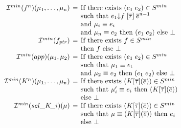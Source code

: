 \[\setlength{\arraycolsep}{2pt}
\begin{array}{rcl}
   \mlinterp{f^{\ar}}(\mu_1,\ldots,\mu_n) & = & 
       \multicolumn{1}{l}{\text{If there exists } (e_1\;e_2) \in S^{min}} \\
   & & \multicolumn{1}{l}{\text{such that } e_1{\SDownarrow}f\;[\taus]\;\oln{e}{\ar-1}} \\
   & & \multicolumn{1}{l}{\text{and } \mu_i \equiv e_i} \\
   & & \multicolumn{1}{l}{\text{and } \mu_{\ar} \equiv e_2 \text{ then } (e_1\;e_2) \text{ else } \bot} \\
   \mlinterp{f_{ptr}} & = & \text{If there exists } f \in S^{min} \\
                        &   & \text{then } f \text{ else } \bot \\
  \mlinterp{app}(\mu_1,\mu_2) & = & \text{If there exists } (e_1\;e_2) \in S^{min} \\ 
                         &   & \text{such that } \mu_1 \equiv e_1 \\ 
                         &   & \text{and } \mu_2 \equiv e_2 \text{ then } (e_1\;e_2) \text{ else } \bot \\
  \mlinterp{K^\ar}(\mu_1,\ldots,\mu_\ar) & = & \text{If there exists } (K[\taus](\ol{e})) \in S^{min} \\
                                    &  & \text{such that } \mu_i' \equiv e_i \text{ then } (K[\taus](\ol{e})) \\
                                    &  & \text{else } \bot \\
  \mlinterp{\sel{K}{i}}(\mu) & = & \text{If there exists } (K[\taus](\ol{e})) \in S^{min} \\ 
                             &   & \text{such that } \mu \equiv (K[\taus](\ol{e})) \text{ then } e_i \\ 
                             &   & \text{else } \bot \\ 

\end{array}\]

